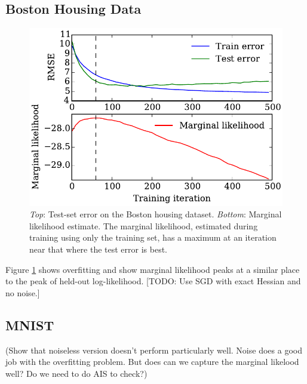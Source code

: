 \documentclass[]{article}
\begin{document}
\subsection{Boston Housing Data}


\begin{figure}[t]
\begin{center}
\includegraphics[width=\columnwidth]{../experiments/2015_03_01_housing/1/marglik}
\vskip -0.1in
\caption{\emph{Top}: Test-set error on the Boston housing dataset.
\emph{Bottom}: Marginal likelihood estimate.
The marginal likelihood, estimated during training using only the training set, has a maximum at an iteration near that where the test error is best.}
\label{fig:housing}
\end{center}
\end{figure}


Figure \ref{fig:housing} shows overfitting and show marginal likelihood peaks at a similar place to the peak of held-out log-likelihood.
[TODO: Use SGD with exact Hessian and no noise.]


\subsection{MNIST}
(Show that noiseless version doesn't perform particularly well. Noise does a
good job with the overfitting problem. But does can we capture the marginal
likelood well? Do we need to do AIS to check?)
\end{document}
